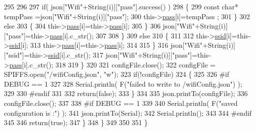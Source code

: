 \begin{DoxyCode}
295                     
296                     
297                     \textcolor{keywordflow}{if}( json[\textcolor{stringliteral}{"Wifi"}+String(i)][\textcolor{stringliteral}{"pass"}].success() )
298                     \{
299                         \textcolor{keyword}{const} \textcolor{keywordtype}{char}* tempPass =json[\textcolor{stringliteral}{"Wifi"}+String(i)][\textcolor{stringliteral}{"pass"}];
300                         this->\hyperlink{classCoolWifi_a0c3332a149245aaad060b32593a54c9b}{pass}[i]=tempPass ;                    
301                     \}
302                     \textcolor{keywordflow}{else}
303                     \{
304                         this->\hyperlink{classCoolWifi_a0c3332a149245aaad060b32593a54c9b}{pass}[i]=this->\hyperlink{classCoolWifi_a0c3332a149245aaad060b32593a54c9b}{pass}[i];                    
305                     \}
306                     json[\textcolor{stringliteral}{"Wifi"}+String(i)][\textcolor{stringliteral}{"pass"}]=this->\hyperlink{classCoolWifi_a0c3332a149245aaad060b32593a54c9b}{pass}[i].c\_str();           
307                 
308                 \}
309                 \textcolor{keywordflow}{else}
310                 \{
311                     
312                     this->\hyperlink{classCoolWifi_a893b21d0fed821438733bba2e73fb4c2}{ssid}[i]=this->\hyperlink{classCoolWifi_a893b21d0fed821438733bba2e73fb4c2}{ssid}[i];
313                     this->\hyperlink{classCoolWifi_a0c3332a149245aaad060b32593a54c9b}{pass}[i]=this->\hyperlink{classCoolWifi_a0c3332a149245aaad060b32593a54c9b}{pass}[i];                    
314                     
315                 \}
316                 json[\textcolor{stringliteral}{"Wifi"}+String(i)][\textcolor{stringliteral}{"ssid"}]=this->\hyperlink{classCoolWifi_a893b21d0fed821438733bba2e73fb4c2}{ssid}[i].c\_str();
317                 json[\textcolor{stringliteral}{"Wifi"}+String(i)][\textcolor{stringliteral}{"pass"}]=this->\hyperlink{classCoolWifi_a0c3332a149245aaad060b32593a54c9b}{pass}[i].c\_str();           
318                         
319             \}
320 
321             configFile.close();
322             configFile = SPIFFS.open(\textcolor{stringliteral}{"/wifiConfig.json"}, \textcolor{stringliteral}{"w"});
323             \textcolor{keywordflow}{if}(!configFile)
324             \{
325             
326 \textcolor{preprocessor}{            #if DEBUG == 1 }
327 
328                 Serial.println( F(\textcolor{stringliteral}{"failed to write to /wifiConfig.json"}) );
329             
330 \textcolor{preprocessor}{            #endif}
331 
332                 \textcolor{keywordflow}{return}(\textcolor{keyword}{false});              
333             \}
334             
335             json.printTo(configFile);
336             configFile.close();
337 
338 \textcolor{preprocessor}{        #if DEBUG == 1 }
339 
340             Serial.println( F(\textcolor{stringliteral}{"saved configuration is :"}) );
341             json.printTo(Serial);
342             Serial.println();
343         
344 \textcolor{preprocessor}{        #endif}
345 
346             \textcolor{keywordflow}{return}(\textcolor{keyword}{true}); 
347         \}
348     \}   
349     
350 
351 \}
\end{DoxyCode}
